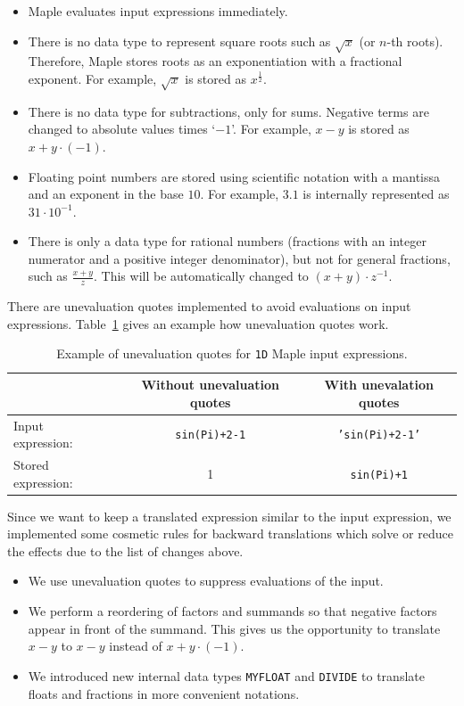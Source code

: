 \documentclass[a4paper,11pt]{article}
\newcommand{\Maple}{Maple}
\theoremstyle{defTheoStyle}
\theoremstyle{defExampStyle}
\begin{document}
\begin{itemize}
\item \Maple{} evaluates input expressions immediately.
\item There is no data type to represent square roots such as $\sqrt{x}$ (or $n$-th roots). Therefore, \Maple{} stores roots as an exponentiation with a fractional exponent. For example, $\sqrt{x}$ is stored as $x^{\frac{1}{2}}$.
\item There is no data type for subtractions, only for sums. Negative terms are changed to absolute values times `$-1$'. For example, $x-y$ is stored as $x + y \cdot (-1)$. 
\item Floating point numbers are stored using scientific notation with a mantissa and an exponent in the base $10$. For example, $3.1$ is internally represented as $31 \cdot 10^{-1}$.
\item There is only a data type for rational numbers (fractions with an integer numerator and a positive integer denominator), but not for general fractions, such as $\frac{x+y}{z}$. This will be automatically changed to $(x+y)\cdot z^{-1}$.
\end{itemize}

There are unevaluation quotes implemented to avoid evaluations on input expressions. Table~\ref{tab:unevaluation-quotes} gives an example how unevaluation quotes work.

\begin{table}[ht]
\centering
\begin{tabular}{lcc}
\hline
& Without unevaluation quotes & With unevalation quotes\\
\hline
Input expression:~& \texttt{sin(Pi)+2-1} & \texttt{'sin(Pi)+2-1'}\\
Stored expression:~& 1 & \texttt{sin(Pi)+1}\\
\hline
\end{tabular}
\caption{Example of unevaluation quotes for \texttt{1D} \Maple{} input expressions.}
\label{tab:unevaluation-quotes}
\end{table}

Since we want to keep a translated expression similar to the input expression, we implemented some cosmetic rules 
for backward translations which solve or reduce the effects due to the list of changes above. 
\begin{itemize}
\item We use unevaluation quotes to suppress evaluations of the input.
\item We perform a reordering of factors and summands so that negative factors appear in front of the summand. This gives us the opportunity to translate $x - y$ to $x - y$ instead of $x + y \cdot (-1)$.
\item We introduced new internal data types \texttt{MYFLOAT} and \texttt{DIVIDE} to translate floats and fractions in more convenient notations.
\end{itemize}
\end{document}
